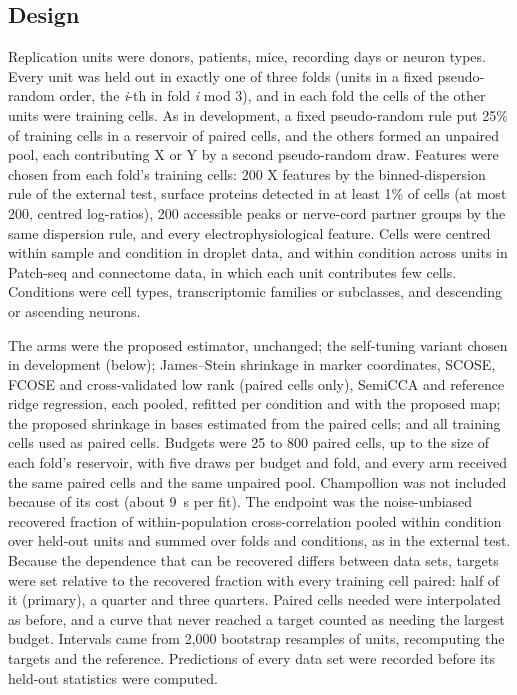 \subsection*{Design}
Replication units were donors, patients, mice, recording days or neuron types. Every unit was held out in exactly one of three folds (units in a fixed pseudo-random order, the \textit{i}-th in fold \textit{i} mod 3), and in each fold the cells of the other units were training cells. As in development, a fixed pseudo-random rule put 25\% of training cells in a reservoir of paired cells, and the others formed an unpaired pool, each contributing X or Y by a second pseudo-random draw. Features were chosen from each fold's training cells: 200 X features by the binned-dispersion rule of the external test, surface proteins detected in at least 1\% of cells (at most 200, centred log-ratios), 200 accessible peaks or nerve-cord partner groups by the same dispersion rule, and every electrophysiological feature. Cells were centred within sample and condition in droplet data, and within condition across units in Patch-seq and connectome data, in which each unit contributes few cells. Conditions were cell types, transcriptomic families or subclasses, and descending or ascending neurons.

The arms were the proposed estimator, unchanged; the self-tuning variant chosen in development (below); James--Stein shrinkage in marker coordinates, SCOSE, FCOSE and cross-validated low rank (paired cells only), SemiCCA and reference ridge regression, each pooled, refitted per condition and with the proposed map; the proposed shrinkage in bases estimated from the paired cells; and all training cells used as paired cells. Budgets were 25 to 800 paired cells, up to the size of each fold's reservoir, with five draws per budget and fold, and every arm received the same paired cells and the same unpaired pool. Champollion was not included because of its cost (about 9~s per fit). The endpoint was the noise-unbiased recovered fraction of within-population cross-correlation pooled within condition over held-out units and summed over folds and conditions, as in the external test. Because the dependence that can be recovered differs between data sets, targets were set relative to the recovered fraction with every training cell paired: half of it (primary), a quarter and three quarters. Paired cells needed were interpolated as before, and a curve that never reached a target counted as needing the largest budget. Intervals came from 2,000 bootstrap resamples of units, recomputing the targets and the reference. Predictions of every data set were recorded before its held-out statistics were computed.

